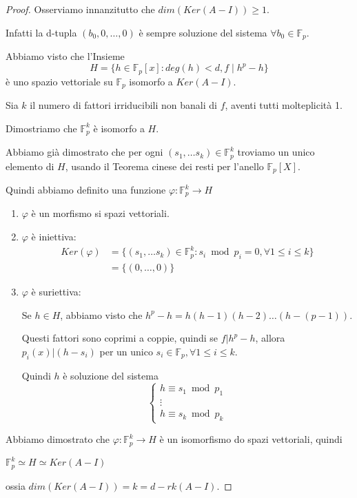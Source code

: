 \documentclass[10pt,a4paper,twoside]{book}
\begin{document}
\begin{proof}
    Osserviamo innanzitutto che $dim(Ker(A - I)) \geq 1$.

    Infatti la d-tupla $(b_0, 0 , \ldots, 0)$ è sempre soluzione del sistema $\forall b_0 \in \mathbb{F}_p$.

    Abbiamo visto che l'Insieme
    \begin{equation*}
        H = \{ h \in \mathbb{F}_p[x] : deg (h) < d, f \mid h^p - h\}
    \end{equation*}
    è uno spazio vettoriale su $\mathbb{F}_p$ isomorfo a $Ker(A - I)$.

    Sia $k$ il numero di fattori irriducibili non banali di $f$, aventi tutti molteplicità 1.

    Dimostriamo che $\mathbb{F}_p^k$ è isomorfo a $H$.

    Abbiamo già dimostrato che per ogni $(s_1, \ldots s_k) \in \mathbb{F}_p^k$ troviamo un unico elemento di $H$, usando il Teorema cinese dei resti per l'anello $\mathbb{F}_p[X]$.

    Quindi abbiamo definito una funzione $\varphi : \mathbb{F}_p^k \rightarrow H$
    \begin{enumerate}[label=\alph*)]
        \item $\varphi$ è un morfismo si spazi vettoriali.
        \item $\varphi$ è iniettiva:
              \begin{align*}
                  Ker(\varphi) & = \{(s_1, \ldots s_k) \in \mathbb{F}_p^k : s_i \bmod p_i = 0, \forall 1 \leq i \leq k\} \\
                               & =\{(0, \ldots , 0)\}
              \end{align*}

        \item $\varphi$ è suriettiva:

              Se $h \in H$, abbiamo visto che $h^p - h = h (h - 1)(h - 2)\ldots(h - (p - 1))$.

              Questi fattori sono coprimi a coppie, quindi se $f | h^p - h$, allora $p_i(x) | (h - s_i)$ per un unico $s_i \in \mathbb{F}_p, \forall 1 \leq i \leq k$.

              Quindi $h$ è soluzione del sistema
              \begin{equation*}
                  \begin{cases}
                      h \equiv s_1 \bmod p_1 \\
                      \vdots                 \\
                      h \equiv s_k \bmod p_k
                  \end{cases}
              \end{equation*}
    \end{enumerate}
    Abbiamo dimostrato che $\varphi : \mathbb{F}_p^k \rightarrow H $ è un isomorfismo do spazi vettoriali, quindi
    \begin{center}
        $\mathbb{F}_p^k \simeq H \simeq Ker(A - I)$
    \end{center}
    ossia $dim(Ker(A - I)) = k = d - rk(A - I)$.
\end{proof}
\end{document}
